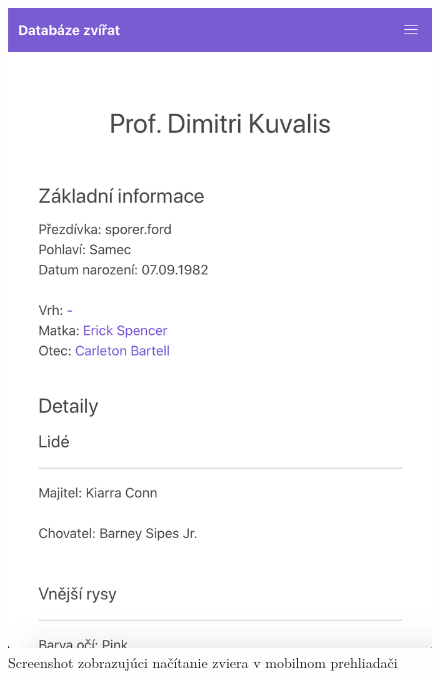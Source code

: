 \begin{figure}[H]
	\includegraphics[width=1.0\textwidth]{media/priloha/mobil/4.png}
	\caption{Screenshot zobrazujúci načítanie zviera v mobilnom prehliadači}
\end{figure}

